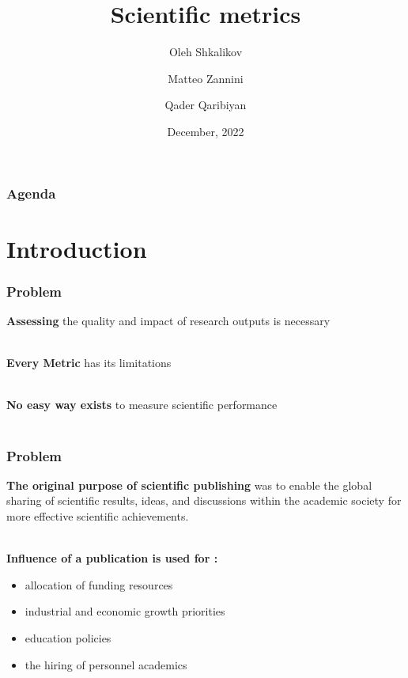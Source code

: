 \documentclass{beamer}
\title{Scientific metrics}
\author[O. Shkalikov \and M. Zannini \and Q. Qaribiyan]
{Oleh Shkalikov \and Matteo Zannini \and Qader Qaribiyan}
\institute{TU Dresden, Computer Science Faculty}
\date{December, 2022}
\begin{document}
\frame{\titlepage}

\begin{frame}
    \frametitle{Agenda}
    \tableofcontents
\end{frame}

\section{Introduction}
\begin{frame}
    \frametitle{Problem}
    \textbf{Assessing} the quality and impact of research outputs is necessary \\~\

    \textbf{Every Metric} has its limitations\\~\

    \textbf{No easy way exists} to measure scientific performance\\~\
\end{frame}

\begin{frame}
    \frametitle{Problem}
    \textbf{The original purpose of scientific publishing} was to enable the global sharing of scientific results, ideas, and discussions within the academic society for more effective scientific achievements.\\~\

    \textbf{Influence of a publication is used for :}
    \begin{itemize}
        \item allocation of funding resources
        \item industrial and economic growth priorities
        \item education policies
        \item the hiring of personnel academics
    \end{itemize}
\end{frame}
\end{document}
